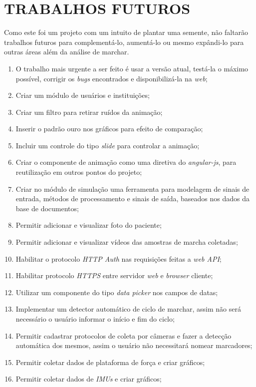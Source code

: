 \chapter[TRABALHOS FUTUROS]{\textbf{TRABALHOS FUTUROS}}
Como este foi um projeto com um intuito de plantar uma semente, não faltarão trabalhos futuros para complementá-lo, aumentá-lo ou mesmo expândi-lo para outras áreas além da análise de marchar.
\begin{enumerate}
	\item O trabalho mais urgente a ser feito é usar a versão atual, testá-la o máximo possível, corrigir os \emph{bugs} encontrados e disponibilizá-la na \emph{web};
	\item Criar um módulo de usuários e instituições;
	\item Criar um filtro para retirar ruídos da animação;
	\item Inserir o padrão ouro nos gráficos para efeito de comparação;
	\item Incluir um controle do tipo \emph{slide} para controlar a animação;
	\item Criar o componente de animação como uma diretiva do \emph{angular-js}, para reutilização em outros pontos do projeto;
	\item Criar no módulo de simulação uma ferramenta para modelagem de sinais de entrada, métodos de processamento e sinais de saída, baseados nos dados da base de documentos;
	\item Permitir adicionar e visualizar foto do paciente;
	\item Permitir adicionar e visualizar vídeos das amostras de marcha coletadas;
	\item Habilitar o protocolo \emph{HTTP Auth} nas requisições feitas a \emph{web API};
	\item Habilitar protocolo \emph{HTTPS} entre servidor \emph{web} e \emph{browser} cliente;
	\item Utilizar um componente do tipo \emph{data picker} nos campos de datas;
	\item Implementar um detector automático de ciclo de marchar, assim não será necessário o usuário informar o início e fim do ciclo;
	\item Permitir cadastrar protocolos de coleta por câmeras e fazer a detecção automática dos mesmos, assim o usuário não necessitará nomear marcadores;
	\item Permitir coletar dados de plataforma de força e criar gráficos;
	\item Permitir coletar dados de \emph{IMUs} e criar gráficos;

\end{enumerate}
